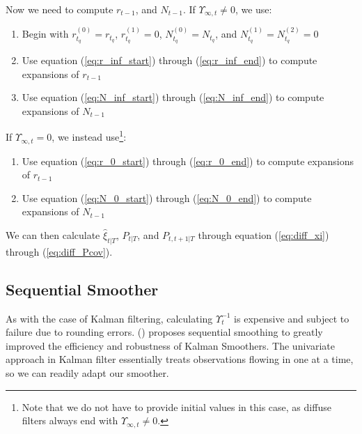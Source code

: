 \documentclass[10pt, titlepage]{article}
\newenvironment{boenumerate}
    {\begin{enumerate}\renewcommand\labelenumi{\textbf\theenumi}}
    {\end{enumerate}}
\numberwithin{equation}{section}
\begin{document}
Now we need to compute $r_{t-1}$, and $N_{t-1}$. If $\Upsilon_{\infty,t}\neq 0$, we use:
\begin{boenumerate}
    \item Begin with $r_{t_q}^{(0)}=r_{t_q}$, $r_{t_q}^{(1)}=0$, $N_{t_q}^{(0)}=N_{t_q}$, and $N_{t_q}^{(1)}=N_{t_q}^{(2)}=0$
    \item Use equation (\ref{eq:r_inf_start}) through (\ref{eq:r_inf_end}) to compute expansions of $r_{t-1}$
    \item Use equation (\ref{eq:N_inf_start}) through (\ref{eq:N_inf_end}) to compute expansions of $N_{t-1}$
\end{boenumerate}

If $\Upsilon_{\infty,t}=0$, we instead use\footnote{Note that we do not have to provide initial values in this case, as diffuse filters always end with $\Upsilon_{\infty,t}\neq 0$.}:
\begin{boenumerate}
    \item Use equation (\ref{eq:r_0_start}) through (\ref{eq:r_0_end}) to compute expansions of $r_{t-1}$
    \item Use equation (\ref{eq:N_0_start}) through (\ref{eq:N_0_end}) to compute expansions of $N_{t-1}$
\end{boenumerate}

We can then calculate $\hat{\xi}_{t|T}$, $P_{t|T}$, and $P_{t,t+1|T}$ through equation (\ref{eq:diff_xi}) through (\ref{eq:diff_Pcov}). 

\subsection{Sequential Smoother}
As with the case of Kalman filtering, calculating $\Upsilon_t^{-1}$ is expensive and subject to failure due to rounding errors. (\cite{durbin_koopman_2000}) proposes sequential smoothing to greatly improved the efficiency and robustness of Kalman Smoothers. The univariate approach in Kalman filter essentially treats observations flowing in one at a time, so we can readily adapt our smoother.
\end{document}
